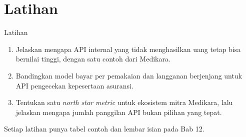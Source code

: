 \documentclass[aspectratio=169, table, 12pt]{beamer}
\begin{document}
\section{Latihan}

\begin{frame}{{\Large Latihan}}
  \vspace{8pt}
  \begin{enumerate}
    \item Jelaskan mengapa API internal yang tidak menghasilkan uang tetap bisa bernilai tinggi, dengan satu contoh dari Medikara.
    \item Bandingkan model bayar per pemakaian dan langganan berjenjang untuk API pengecekan kepesertaan asuransi.
    \item Tentukan satu \textit{north star metric} untuk ekosistem mitra Medikara, lalu jelaskan mengapa jumlah panggilan API bukan pilihan yang tepat.
  \end{enumerate}
  \vspace{8pt}
  {\small Setiap latihan punya tabel contoh dan lembar isian pada Bab 12.}
\end{frame}
\end{document}
